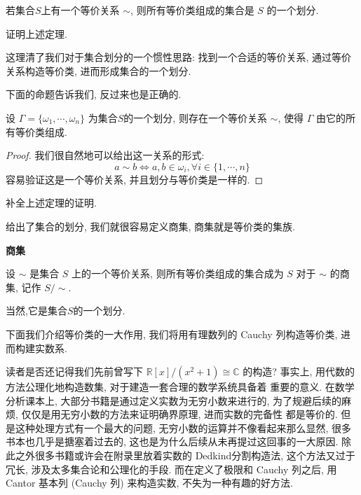 \documentclass[UTF8]{book}
\begin{document}
\begin{theorem}
    若集合$S$上有一个等价关系 $\sim$, 则所有等价类组成的集合是 $S$ 的一个划分.
\end{theorem}

\begin{exercise}
    证明上述定理. 
\end{exercise}

这理清了我们对于集合划分的一个惯性思路: 
找到一个合适的等价关系, 通过等价关系构造等价类, 
进而形成集合的一个划分.

下面的命题告诉我们, 反过来也是正确的.

\begin{proposition}
    设 $\varGamma =\{\omega_1,\cdots,\omega_n\}$ 为集合$S$的一个划分, 
    则存在一个等价关系 $\sim$, 使得 $\varGamma$ 由它的所有等价类组成. 
\end{proposition}

\begin{proof}
    我们很自然地可以给出这一关系的形式:
    $$a\sim b \Leftrightarrow a,b \in \omega_i, 
    \forall i \in \{1,\cdots,n\}$$ 
    容易验证这是一个等价关系, 并且划分与等价类是一样的. 
\end{proof}

\begin{exercise}
    补全上述定理的证明. 
\end{exercise}

给出了集合的划分, 我们就很容易定义商集, 商集就是等价类的集族. 

\begin{definition}
    \textbf{商集}

    设 $\sim$ 是集合 $S$ 上的一个等价关系, 
    则所有等价类组成的集合成为 $S$ 对于 $\sim$ 的商集,
    记作 $S/\sim$.

    当然,它是集合$S$的一个划分.
\end{definition}

下面我们介绍等价类的一大作用, 我们将用有理数列的 Cauchy 列构造等价类, 
进而构建实数系. 

读者是否还记得我们先前曾写下 $\mathbb{R}[x]/(x^2+1) \cong \mathbb{C}$ 
的构造? 事实上, 用代数的方法公理化地构造数集, 对于建造一套合理的数学系统具备着
重要的意义. 在数学分析课本上, 大部分书籍是通过定义实数为无穷小数来进行的, 
为了规避后续的麻烦, 仅仅是用无穷小数的方法来证明确界原理, 进而实数的完备性
都是等价的. 但是这种处理方式有一个最大的问题, 无穷小数的运算并不像看起来那么显然, 
很多书本也几乎是搪塞着过去的, 这也是为什么后续从未再提过这回事的一大原因. 
除此之外很多书籍或许会在附录里放着实数的 Dedkind分割构造法, 
这个方法又过于冗长, 涉及太多集合论和公理化的手段. 
而在定义了极限和 Cauchy 列之后, 用 Cantor 基本列 (Cauchy 列) 
来构造实数, 不失为一种有趣的好方法. 
\end{document}
